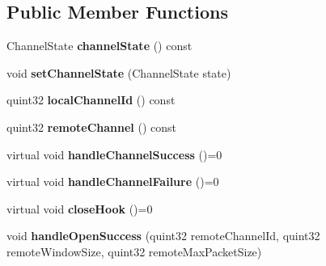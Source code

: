 \subsection*{Public Member Functions}
\begin{DoxyCompactItemize}
\item 
\mbox{\label{class_q_ssh_1_1_internal_1_1_abstract_ssh_channel_a5352767bcba9c6a1377f4353a215f5f7}} 
Channel\+State {\bfseries channel\+State} () const
\item 
\mbox{\label{class_q_ssh_1_1_internal_1_1_abstract_ssh_channel_af7413389006da99e4fe90a76d089bf00}} 
void {\bfseries set\+Channel\+State} (Channel\+State state)
\item 
\mbox{\label{class_q_ssh_1_1_internal_1_1_abstract_ssh_channel_adcd8a7131d7b342fe1071e7813f007eb}} 
quint32 {\bfseries local\+Channel\+Id} () const
\item 
\mbox{\label{class_q_ssh_1_1_internal_1_1_abstract_ssh_channel_a65a44043febaf4a1c5be6e3d09871826}} 
quint32 {\bfseries remote\+Channel} () const
\item 
\mbox{\label{class_q_ssh_1_1_internal_1_1_abstract_ssh_channel_af1b1b34d2b57cf567aca0875c2d41380}} 
virtual void {\bfseries handle\+Channel\+Success} ()=0
\item 
\mbox{\label{class_q_ssh_1_1_internal_1_1_abstract_ssh_channel_a59729988cad8338a488bdebc6abdd80e}} 
virtual void {\bfseries handle\+Channel\+Failure} ()=0
\item 
\mbox{\label{class_q_ssh_1_1_internal_1_1_abstract_ssh_channel_a266f87db65b98437dc84bce55340e84b}} 
virtual void {\bfseries close\+Hook} ()=0
\item 
\mbox{\label{class_q_ssh_1_1_internal_1_1_abstract_ssh_channel_add1ea425fa4f87ea855665bfa078ec20}} 
void {\bfseries handle\+Open\+Success} (quint32 remote\+Channel\+Id, quint32 remote\+Window\+Size, quint32 remote\+Max\+Packet\+Size)

\end{DoxyCompactItemize}
